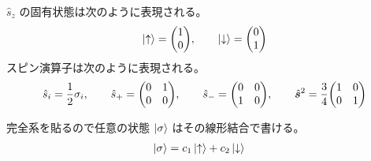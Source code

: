 \documentclass[uplatex,dvipdfmx,a4paper,11pt]{jlreq}
\theoremstyle{definition}
\begin{document}
\begin{proposition}
  $\hat{s}_z$ の固有状態は次のように表現される。
  \begin{align}
    \ket{\uparrow} = \mqty(1   \\ 0), \qquad
    \ket{\downarrow} = \mqty(0 \\ 1)
  \end{align}
  スピン演算子は次のように表現される。
  \begin{align}
    \hat{s}_i = \frac{1}{2}\sigma_i, \qquad
    \hat{s}_+ = \mqty(0                 & 1 \\ 0 & 0), \qquad
    \hat{s}_- = \mqty(0                 & 0 \\ 1 & 0), \qquad
    \hat{\bm{s}}^2 = \frac{3}{4}\mqty(1 & 0 \\ 0 & 1)
  \end{align}
\end{proposition}

\begin{proposition}
  完全系を貼るので任意の状態 $\ket{\sigma}$ はその線形結合で書ける。
  \begin{align}
    \ket{\sigma} & = c_1\ket{\uparrow} + c_2\ket{\downarrow}
  \end{align}


\end{proposition}
\end{document}
